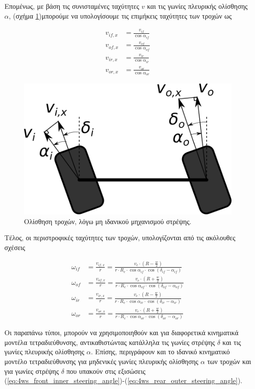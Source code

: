 {Επομένως, με βάση τις συνισταμένες ταχύτητες $v$ και τις γωνίες πλευρικής ολίσθησης $\alpha$, (σχήμα \ref{fig:slip_angles})μπορούμε να υπολογίσουμε τις επιμήκεις ταχύτητες των τροχών ως

\begin{align}
	\label{eq:monst_vifx}	
	v_{if,x} &= \frac{v_{if}}{\cos\alpha_{if}}\\
	\label{eq:monst_vofx}	
	v_{of,x} &= \frac{v_{of}}{\cos\alpha_{of}} \\
	\label{eq:monst_virx}	
	v_{ir,x} &= \frac{v_{ir}}{\cos\alpha_{ir}} \\
	\label{eq:monst_vorx}
	v_{or,x} &= \frac{v_{or}}{\cos\alpha_{or}}
\end{align}

\begin{figure}[!ht]
   \centering
	\includegraphics[width=0.35\linewidth]{Chapters/Chapter2/Figures/slip_angles.png}
	\caption{Ολίσθηση τροχών, λόγω μη ιδανικού μηχανισμού στρέψης.}
	\label{fig:slip_angles}
\end{figure}


\bigskip
Τέλος, οι περιστροφικές ταχύτητες των τροχών, υπολογίζονται από τις ακόλουθες σχέσεις

\begin{align}
	\label{eq:monst_wif}	
	\omega_{if} &= \frac{v_{if,x}}{r} = \frac{v_c \cdot (R - \frac{w}{2})}{r \cdot R_c \cdot \cos\alpha_{if} \cdot \cos(\delta_{if} - \alpha_{if})}\\
	\label{eq:monst_wof}
	\omega_{of} &= \frac{v_{of,x}}{r} = \frac{v_c \cdot (R + \frac{w}{2})}{r \cdot R_c \cdot \cos\alpha_{of} \cdot \cos(\delta_{of} - \alpha_{of})}\\
	\label{eq:monst_wir}	
	\omega_{ir} &= \frac{v_{ir,x}}{r} = \frac{v_c \cdot (R - \frac{w}{2})}{r \cdot R_c \cdot \cos\alpha_{ir} \cdot \cos(\delta_{ir} - \alpha_{ir})}\\
	\label{eq:monst_wor}
	\omega_{or} &= \frac{v_{or,x}}{r} = \frac{v_c \cdot (R + \frac{w}{2})}{r \cdot R_c \cdot \cos\alpha_{or} \cdot \cos(\delta_{or} - \alpha_{or})}
\end{align}

\bigskip
Οι παραπάνω τύποι, μπορούν να χρησιμοποιηθούν και για διαφορετικά κινηματικά μοντέλα {τετραδιεύθυνσης}, αντικαθιστώντας κατάλληλα τις γωνίες στρέψης $\delta$ και τις γωνίες πλευρικής ολίσθησης $\alpha$. Επίσης, περιγράφουν και το ιδανικό κινηματικό μοντέλο {τετραδιεύθυνσης} για μηδενικές γωνίες πλευρικής ολίσθησης $\alpha$ των τροχών και για γωνίες στρέψης $\delta$ που υπακούν στις εξισώσεις  (\ref{eq:4ws_front_inner_steering_angle})-(\ref{eq:4ws_rear_outer_steering_angle}).

}
